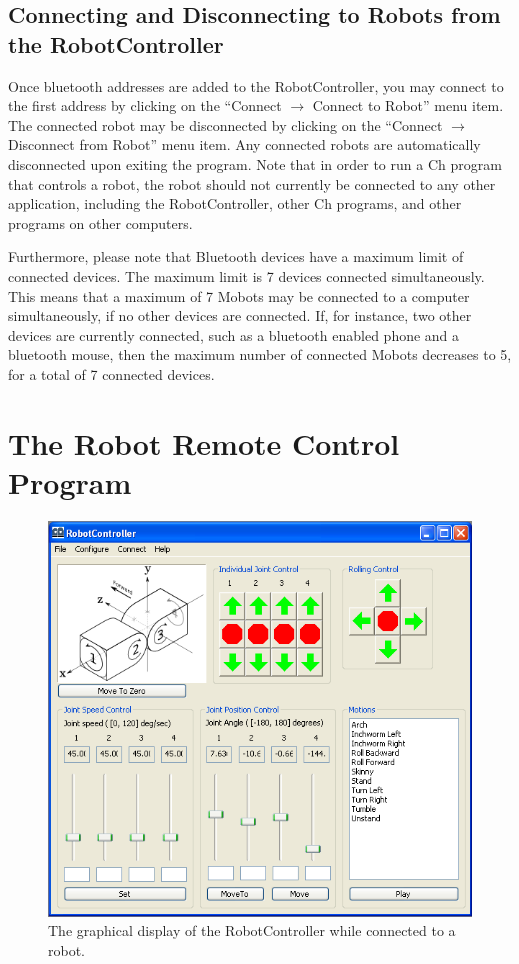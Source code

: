 \documentclass{article}
\begin{document}
\subsection{Connecting and Disconnecting to Robots from the RobotController}
Once bluetooth addresses are added to the RobotController, you may connect to the 
first address by clicking on the ``Connect $\rightarrow$ Connect to Robot''
menu item. The connected robot may be disconnected by clicking on the 
``Connect $\rightarrow$ Disconnect from Robot'' menu item. Any connected robots are
automatically disconnected upon exiting the program. Note that in order to run a Ch
program that controls a robot, the robot should not currently be connected to any
other application, including the RobotController, other Ch programs, and other
programs on other computers.

Furthermore, please note that Bluetooth devices have a maximum limit of connected 
devices. The maximum limit is 7 devices connected simultaneously. This means that 
a maximum of 7 Mobots may be connected to a computer simultaneously, if no
other devices are connected. If, for instance, two other devices are currently 
connected, such as a bluetooth enabled phone and a bluetooth mouse, then the 
maximum number of connected Mobots decreases to 5, for a total of 7 connected 
devices.

\section{ The Robot Remote Control Program }
\begin{figure}[H]
\begin{center}
\includegraphics[width=4.5in]{images/shot1_populated.png}
\end{center}
\caption{\label{fig:shot1_populated.png} The graphical display of the RobotController
while connected to a robot.}
\end{figure}
\end{document}
